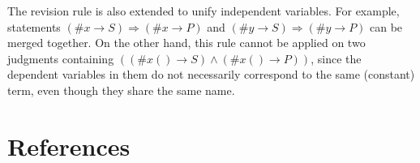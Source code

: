 The revision rule is also extended to unify independent variables. For example, statements
\((\#x \rightarrow S) \Rightarrow (\#x \rightarrow P)\) and
\((\#y \rightarrow S) \Rightarrow (\#y \rightarrow P)\) can be merged together. On the other hand, this rule cannot be applied on two judgments containing \(((\#x() \rightarrow S) \wedge (\#x() \rightarrow P))\), since the dependent variables in them do not necessarily correspond to the same (constant) term, even though they share the same name.


\section*{References}

\cite[Chapter 5]{wp:book1}
